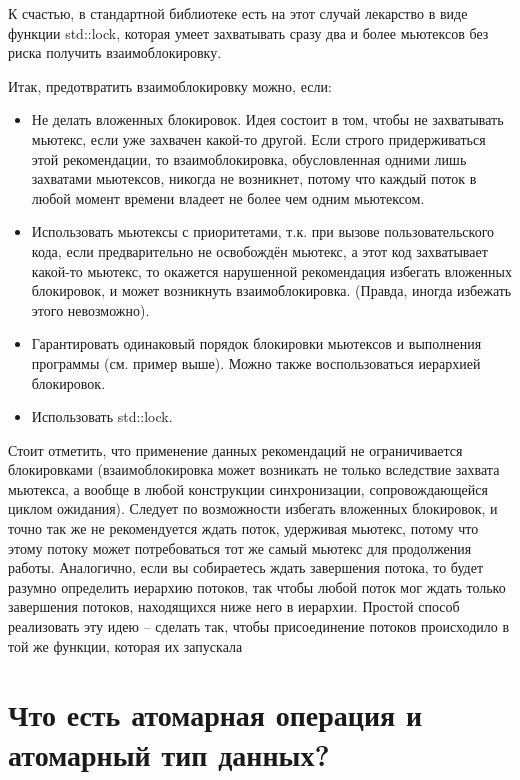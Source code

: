 \documentclass[a4paper,12pt]{article}	%
\begin{document}
	К счастью, в стандартной библиотеке есть на этот случай лекарство в виде функции std::lock, которая умеет захватывать сразу два и более мьютексов без риска получить взаимоблокировку.
	
	Итак, предотвратить взаимоблокировку можно, если:
	
	\begin{itemize}
	
		\item Не делать вложенных блокировок. Идея состоит в том, чтобы не захватывать мьютекс, если уже захвачен какой-то другой. Если строго придерживаться этой рекомендации, то взаимоблокировка, обусловленная одними лишь захватами мьютексов, никогда не возникнет, потому что каждый поток в любой момент времени владеет не более чем одним мьютексом.
		\item Использовать мьютексы с приоритетами, т.к. при вызове пользовательского кода, если предварительно не освобождён мьютекс, а этот код захватывает какой-то мьютекс, то окажется нарушенной рекомендация избегать вложенных блокировок, и может возникнуть взаимоблокировка. (Правда, иногда избежать этого невозможно).
		\item Гарантировать одинаковый порядок блокировки мьютексов и выполнения программы (см. пример выше). Можно также воспользоваться иерархией блокировок.
		\item Использовать std::lock.
		
	\end{itemize}
	
	Стоит отметить, что применение данных рекомендаций не ограничивается блокировками (взаимоблокировка может возникать не только вследствие захвата мьютекса, а вообще в любой конструкции синхронизации, сопровождающейся циклом ожидания). Следует по возможности избегать вложенных блокировок, и точно так же не рекомендуется ждать поток, удерживая мьютекс, потому что этому потоку может потребоваться тот же самый мьютекс для продолжения работы. Аналогично, если вы собираетесь ждать завершения потока, то будет разумно определить иерархию потоков, так чтобы любой поток мог ждать только завершения потоков, находящихся ниже него в иерархии. Простой способ реализовать эту идею – сделать так, чтобы присоединение потоков происходило в той же функции, которая их запускала
	
\section{Что есть атомарная операция и атомарный тип данных?}
	
\end{document}
